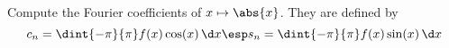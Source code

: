 
\bexo
 Compute the Fourier coefficients of $x\mapsto \abs{x}$. They are defined by
 \begin{equation}
 	c_n=\dint{-\pi}{\pi} f(x)\cos(x) \,\d x 
 	\esp s_n=\dint{-\pi}{\pi} f(x)\sin(x) \,\d x 
 \end{equation}
\eexo

\solution{
}